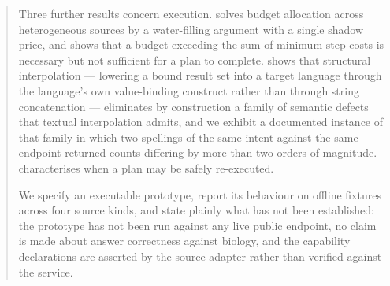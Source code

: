 \documentclass[11pt,a4paper]{article}
\theoremstyle{plain}
\theoremstyle{definition}
\theoremstyle{remark}
\begin{document}
\begin{abstract}
Three further results concern execution.  solves budget
allocation across heterogeneous sources by a water-filling argument with a
single shadow price, and  shows that a
budget exceeding the sum of minimum step costs is necessary but not sufficient
for a plan to complete.  shows that structural
interpolation --- lowering a bound result set into a target language through
the language's own value-binding construct rather than through string
concatenation --- eliminates by construction a family of semantic defects that
textual interpolation admits, and we exhibit a documented instance of that
family in which two spellings of the same intent against the same endpoint
returned counts differing by more than two orders of magnitude.
 characterises when a plan may be safely re-executed.

We specify an executable prototype, report its behaviour on offline fixtures
across four source kinds, and state plainly what has not been established: the
prototype has not been run against any live public endpoint, no claim is made
about answer correctness against biology, and the capability declarations are
asserted by the source adapter rather than verified against the service.
\end{abstract}

\tableofcontents

\clearpage








\clearpage


\end{document}
